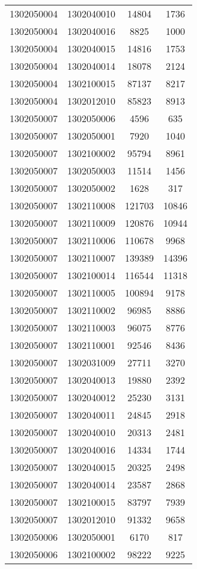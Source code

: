 \begin{longtable}[h]{llcc}
		1302050004 & 1302040010 & 14804 & 1736\\
		1302050004 & 1302040016 & 8825 & 1000\\
		1302050004 & 1302040015 & 14816 & 1753\\
		1302050004 & 1302040014 & 18078 & 2124\\
		1302050004 & 1302100015 & 87137 & 8217\\
		1302050004 & 1302012010 & 85823 & 8913\\
		1302050007 & 1302050006 & 4596 & 635\\
		1302050007 & 1302050001 & 7920 & 1040\\
		1302050007 & 1302100002 & 95794 & 8961\\
		1302050007 & 1302050003 & 11514 & 1456\\
		1302050007 & 1302050002 & 1628 & 317\\
		1302050007 & 1302110008 & 121703 & 10846\\
		1302050007 & 1302110009 & 120876 & 10944\\
		1302050007 & 1302110006 & 110678 & 9968\\
		1302050007 & 1302110007 & 139389 & 14396\\
		1302050007 & 1302100014 & 116544 & 11318\\
		1302050007 & 1302110005 & 100894 & 9178\\
		1302050007 & 1302110002 & 96985 & 8886\\
		1302050007 & 1302110003 & 96075 & 8776\\
		1302050007 & 1302110001 & 92546 & 8436\\
		1302050007 & 1302031009 & 27711 & 3270\\
		1302050007 & 1302040013 & 19880 & 2392\\
		1302050007 & 1302040012 & 25230 & 3131\\
		1302050007 & 1302040011 & 24845 & 2918\\
		1302050007 & 1302040010 & 20313 & 2481\\
		1302050007 & 1302040016 & 14334 & 1744\\
		1302050007 & 1302040015 & 20325 & 2498\\
		1302050007 & 1302040014 & 23587 & 2868\\
		1302050007 & 1302100015 & 83797 & 7939\\
		1302050007 & 1302012010 & 91332 & 9658\\
		1302050006 & 1302050001 & 6170 & 817\\
		1302050006 & 1302100002 & 98222 & 9225\\

\end{longtable}
